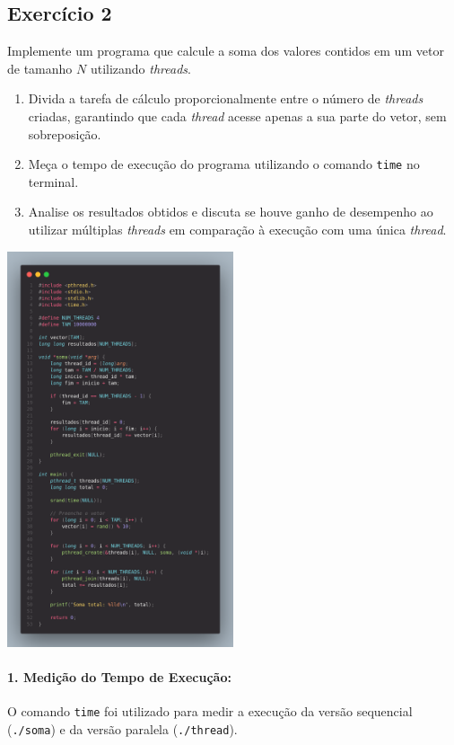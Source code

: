 \documentclass[14pt,a4paper]{article}
\begin{document}
\subsection*{Exercício 2}

Implemente um programa que calcule a soma dos valores contidos em um vetor de tamanho $N$ utilizando \textit{threads}.

\begin{enumerate}
    \item Divida a tarefa de cálculo proporcionalmente entre o número de \textit{threads} criadas, garantindo que cada \textit{thread} acesse apenas a sua parte do vetor, sem sobreposição.
    \item Meça o tempo de execução do programa utilizando o comando \texttt{time} no terminal.
    \item Analise os resultados obtidos e discuta se houve ganho de desempenho ao utilizar múltiplas \textit{threads} em comparação à execução com uma única \textit{thread}.
\end{enumerate}

    \begin{center}
        \includegraphics[width=0.5\textwidth]{code.png}
    \end{center}

    \paragraph{1. Medição do Tempo de Execução:}O comando \texttt{time} foi utilizado para medir a execução da versão sequencial (\texttt{./soma}) e da versão paralela (\texttt{./thread}).
\end{document}
